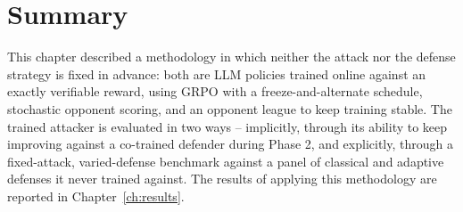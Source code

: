 \section{Summary}
\label{sec:method-summary}

This chapter described a methodology in which neither the attack nor the defense strategy is fixed in advance: both are LLM policies trained online against an exactly verifiable reward, using GRPO with a freeze-and-alternate schedule, stochastic opponent scoring, and an opponent league to keep training stable. The trained attacker is evaluated in two ways -- implicitly, through its ability to keep improving against a co-trained defender during Phase 2, and explicitly, through a fixed-attack, varied-defense benchmark against a panel of classical and adaptive defenses it never trained against. The results of applying this methodology are reported in Chapter~\ref{ch:results}.
